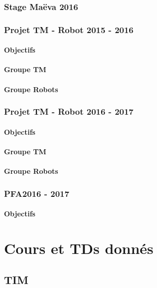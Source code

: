 \documentclass[french,a4paper]{book}
\begin{document}
\subsubsection{Stage Maëva 2016}

\subsubsection{Projet TM - Robot 2015 - 2016}
\paragraph{Objectifs}
\paragraph{Groupe TM}
\paragraph{Groupe Robots}

\subsubsection{Projet TM - Robot 2016 - 2017}
\paragraph{Objectifs}
\paragraph{Groupe TM}
\paragraph{Groupe Robots}

\subsubsection{PFA2016 - 2017}
\paragraph{Objectifs}

\section{Cours et TDs donnés}
\subsection{TIM}
\end{document}
